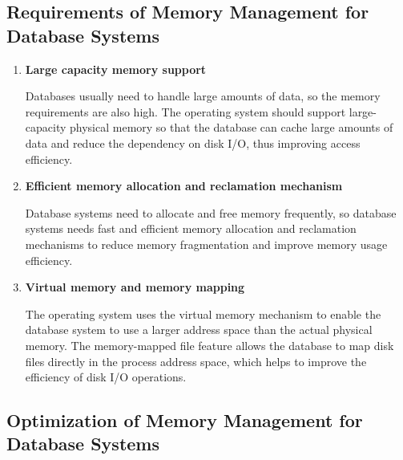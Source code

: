 \documentclass[11pt,a4paper]{article}
\begin{document}
\subsection{Requirements of Memory Management for Database Systems}
\begin{enumerate}
    \item \textbf{Large capacity memory support}
    
    Databases usually need to handle large amounts of data, so the memory requirements are also high. 
    The operating system should support large-capacity physical memory so that the database can cache large amounts of data and reduce the dependency on disk I/O, thus improving access efficiency.
    
    \item \textbf{Efficient memory allocation and reclamation mechanism}
    
    Database systems need to allocate and free memory frequently, so database systems needs fast and efficient memory allocation and reclamation mechanisms to reduce memory fragmentation and improve memory usage efficiency.
    
    \item \textbf{Virtual memory and memory mapping}
    
    The operating system uses the virtual memory mechanism to enable the database system to use a larger address space than the actual physical memory. 
    The memory-mapped file feature allows the database to map disk files directly in the process address space, which helps to improve the efficiency of disk I/O operations.
    
\end{enumerate}

\subsection{Optimization of Memory Management for Database Systems}
\end{document}
